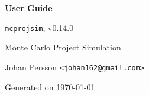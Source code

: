 \documentclass[11pt,a4paper,twoside,openright]{report}
\begin{document}
\begin{titlepage}
  \centering
  \vspace*{2.0cm}
  {\Huge\bfseries\color{brandblue}User Guide\par}
  \vspace{1.2cm}
  {\Large \texttt{mcprojsim}, v0.14.0\par}
  \vspace{1.2cm}
  {\Large Monte Carlo Project Simulation\par}
  \vfill
  {\large Johan Persson \texttt{<johan162@gmail.com>}\par}
  {\large Generated on \today\par}
\end{titlepage}

\cleardoublepage

\tableofcontents
\cleardoublepage


\end{document}
